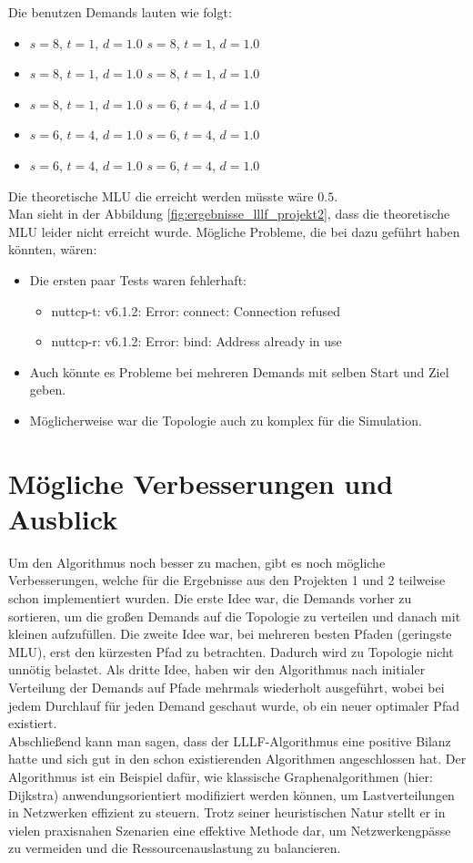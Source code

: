     Die benutzen Demands lauten wie folgt: 
    \begin{itemize}
        \item $s=8$, $t=1$, $d=1.0$ \qquad $s=8$, $t=1$, $d=1.0$ 
        \item $s=8$, $t=1$, $d=1.0$ \qquad $s=8$, $t=1$, $d=1.0$ 
        \item $s=8$, $t=1$, $d=1.0$ \qquad $s=6$, $t=4$, $d=1.0$ 
        \item $s=6$, $t=4$, $d=1.0$ \qquad $s=6$, $t=4$, $d=1.0$ 
        \item $s=6$, $t=4$, $d=1.0$ \qquad $s=6$, $t=4$, $d=1.0$ 
    \end{itemize}
    Die theoretische MLU die erreicht werden müsste wäre $0.5$. \\
    Man sieht in der Abbildung \ref{fig:ergebnisse_lllf_projekt2}, dass die theoretische MLU leider nicht erreicht wurde. Mögliche Probleme, die bei dazu geführt haben könnten, wären:
    \begin{itemize}
        \large
        \item Die ersten paar Tests waren fehlerhaft: 
        \begin{itemize}
            \item nuttcp-t: v6.1.2: Error: connect: Connection refused
            \item nuttcp-r: v6.1.2: Error: bind: Address already in use
        \end{itemize}
        \item Auch könnte es Probleme bei mehreren Demands mit selben Start und Ziel geben.
        \item Möglicherweise war die Topologie auch zu komplex für die Simulation.
    \end{itemize}

\section{Mögliche Verbesserungen und Ausblick}
    Um den Algorithmus noch besser zu machen, gibt es noch mögliche Verbesserungen, welche für die Ergebnisse aus den Projekten 1 und 2 teilweise schon implementiert wurden. Die erste Idee war, die Demands vorher zu sortieren, um die großen Demands auf die Topologie zu verteilen und danach mit kleinen aufzufüllen. Die zweite Idee war, bei mehreren besten Pfaden (geringste MLU), erst den kürzesten Pfad zu betrachten. Dadurch wird zu Topologie nicht unnötig belastet. Als dritte Idee, haben wir den Algorithmus nach initialer Verteilung der Demands auf Pfade mehrmals wiederholt ausgeführt, wobei bei jedem Durchlauf für jeden Demand geschaut wurde, ob ein neuer optimaler Pfad existiert. \\

    Abschließend kann man sagen, dass der LLLF-Algorithmus eine positive Bilanz hatte und sich gut in den schon existierenden Algorithmen angeschlossen hat. Der Algorithmus ist ein Beispiel dafür, wie klassische Graphenalgorithmen (hier: Dijkstra) anwendungsorientiert modifiziert werden können, um Lastverteilungen in Netzwerken effizient zu steuern. Trotz seiner heuristischen Natur stellt er in vielen praxisnahen Szenarien eine effektive Methode dar, um Netzwerkengpässe zu vermeiden und die Ressourcenauslastung zu balancieren.
